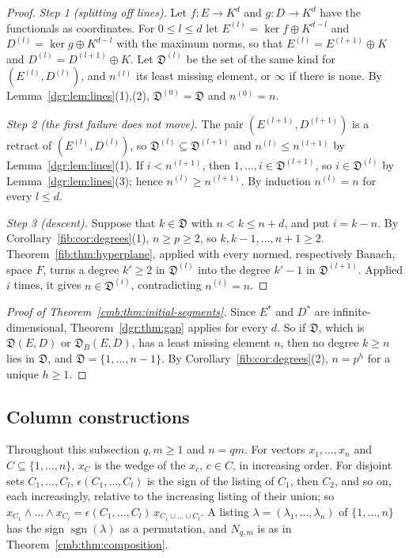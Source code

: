 \documentclass[11pt]{amsart}
\theoremstyle{definition}
\theoremstyle{remark}
\numberwithin{equation}{section}
\newcommand{\sgn}{\operatorname{sgn}}
\theoremstyle{plain}
\theoremstyle{definition}
\theoremstyle{plain}
\newcommand{\fD}{\mathfrak D}
\begin{document}
\begin{proof}
\emph{Step 1 (splitting off lines).} Let $f\colon E\to K^d$ and $g\colon D\to K^d$ have the functionals as coordinates.
For $0\le l\le d$ let $E^{(l)}=\ker f\oplus K^{d-l}$ and $D^{(l)}=\ker g\oplus K^{d-l}$ with the maximum norms, so that
$E^{(l)}=E^{(l+1)}\oplus K$ and $D^{(l)}=D^{(l+1)}\oplus K$. Let $\fD^{(l)}$ be the set of the same kind for
$(E^{(l)},D^{(l)})$, and $n^{(l)}$ its least missing element, or $\infty$ if there is none. By
Lemma~\ref{dgr:lem:lines}(1),(2), $\fD^{(0)}=\fD$ and $n^{(0)}=n$.

\emph{Step 2 (the first failure does not move).} The pair $(E^{(l+1)},D^{(l+1)})$ is a retract of $(E^{(l)},D^{(l)})$,
so $\fD^{(l)}\subseteq\fD^{(l+1)}$ and $n^{(l)}\le n^{(l+1)}$ by Lemma~\ref{dgr:lem:lines}(1). If $i<n^{(l+1)}$, then
$1,\dots,i\in\fD^{(l+1)}$, so $i\in\fD^{(l)}$ by Lemma~\ref{dgr:lem:lines}(3); hence $n^{(l)}\ge n^{(l+1)}$. By induction
$n^{(l)}=n$ for every $l\le d$.

\emph{Step 3 (descent).} Suppose that $k\in\fD$ with $n<k\le n+d$, and put $i=k-n$. By
Corollary~\ref{fib:cor:degrees}(1), $n\ge p\ge2$, so $k,k-1,\dots,n+1\ge2$. Theorem~\ref{fib:thm:hyperplane}, applied with
every normed, respectively Banach, space $F$, turns a degree $k'\ge2$ in $\fD^{(l)}$ into the degree $k'-1$ in
$\fD^{(l+1)}$. Applied $i$ times, it gives $n\in\fD^{(i)}$, contradicting $n^{(i)}=n$.
\end{proof}

\begin{proof}[Proof of Theorem~\ref{cmb:thm:initial-segments}]
Since $E^*$ and $D^*$ are infinite-dimensional, Theorem~\ref{dgr:thm:gap} applies for every $d$. So if $\fD$, which is
$\fD(E,D)$ or $\fD_B(E,D)$, has a least missing element $n$, then no degree $k\ge n$ lies in $\fD$, and
$\fD=\{1,\dots,n-1\}$. By Corollary~\ref{fib:cor:degrees}(2), $n=p^h$ for a unique $h\ge1$.
\end{proof}

\subsection{Column constructions}\label{dgr:ssec:columns}

Throughout this subsection $q,m\ge1$ and $n=qm$. For vectors $x_1,\dots,x_n$ and $C\subseteq\{1,\dots,n\}$, $x_C$ is the
wedge of the $x_c$, $c\in C$, in increasing order. For disjoint sets $C_1,\dots,C_l$, $\epsilon(C_1,\dots,C_l)$ is the sign
of the listing of $C_1$, then $C_2$, and so on, each increasingly, relative to the increasing listing of their union; so
$x_{C_1}\wedge\dots\wedge x_{C_l}=\epsilon(C_1,\dots,C_l)\,x_{C_1\cup\dots\cup C_l}$. A listing
$\lambda=(\lambda_1,\dots,\lambda_n)$ of $\{1,\dots,n\}$ has the sign $\sgn(\lambda)$ as a permutation, and $N_{q,m}$ is as
in Theorem~\ref{cmb:thm:composition}.
\end{document}
